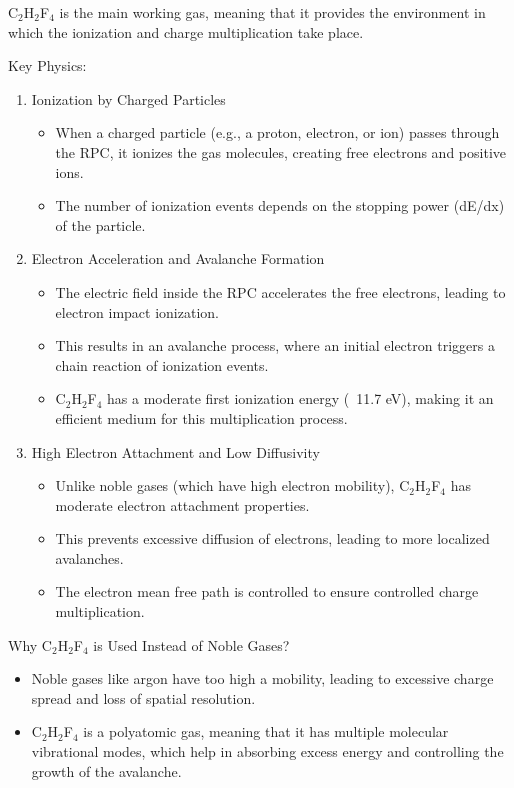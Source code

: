 C$_2$H$_2$F$_4$ is the main working gas, meaning that it provides the environment in which the ionization and charge multiplication take place.

Key Physics:

\begin{enumerate}
	
	\item Ionization by Charged Particles
	\begin{itemize}
		\item When a charged particle (e.g., a proton, electron, or ion) passes through the RPC, it ionizes the gas molecules, creating free electrons and positive ions.
		\item The number of ionization events depends on the stopping power (dE/dx) of the particle.
	\end{itemize}
	\item Electron Acceleration and Avalanche Formation
	\begin{itemize}
		\item The electric field inside the RPC accelerates the free electrons, leading to electron impact ionization.
		\item This results in an avalanche process, where an initial electron triggers a chain reaction of ionization events.
		\item C$_2$H$_2$F$_4$ has a moderate first ionization energy (~11.7 eV), making it an efficient medium for this multiplication process.
	\end{itemize}
	\item High Electron Attachment and Low Diffusivity
	\begin{itemize}
		\item Unlike noble gases (which have high electron mobility), C$_2$H$_2$F$_4$ has moderate electron attachment properties.
		\item This prevents excessive diffusion of electrons, leading to more localized avalanches.
		\item The electron mean free path is controlled to ensure controlled charge multiplication.
	\end{itemize}
	
\end{enumerate}


Why C$_2$H$_2$F$_4$ is Used Instead of Noble Gases?

\begin{itemize}
	\item Noble gases like argon have too high a mobility, leading to excessive charge spread and loss of spatial resolution.
	\item C$_2$H$_2$F$_4$ is a polyatomic gas, meaning that it has multiple molecular vibrational modes, which help in absorbing excess energy and controlling the growth of the avalanche.
\end{itemize}


